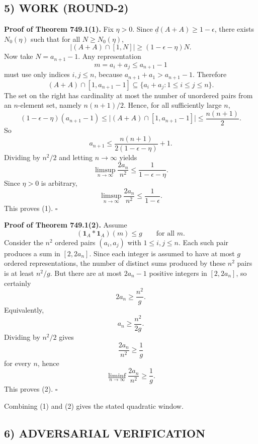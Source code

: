 \subsection*{5) WORK (ROUND-2)}

\noindent
\textbf{Proof of Theorem 749.1(1).}
Fix $\eta>0$.
Since $\underline d(A+A)\ge 1-\epsilon$, there exists $N_0(\eta)$ such that for all $N\ge N_0(\eta)$,
\[
|(A+A)\cap[1,N]|\ge (1-\epsilon-\eta)N.
\]
Now take $N=a_{n+1}-1$.
Any representation
\[
m=a_i+a_j\le a_{n+1}-1
\]
must use only indices $i,j\le n$, because $a_{n+1}+a_1>a_{n+1}-1$.
Therefore
\[
(A+A)\cap[1,a_{n+1}-1]
\subseteq
\{a_i+a_j:1\le i\le j\le n\}.
\]
The set on the right has cardinality at most the number of unordered pairs from an $n$-element set, namely $n(n+1)/2$.
Hence, for all sufficiently large $n$,
\[
(1-\epsilon-\eta)(a_{n+1}-1)
\le
\bigl|(A+A)\cap[1,a_{n+1}-1]\bigr|
\le
\frac{n(n+1)}{2}.
\]
So
\[
a_{n+1}\le \frac{n(n+1)}{2(1-\epsilon-\eta)}+1.
\]
Dividing by $n^2/2$ and letting $n\to\infty$ yields
\[
\limsup_{n\to\infty}\frac{2a_n}{n^2}\le \frac{1}{1-\epsilon-\eta}.
\]
Since $\eta>0$ is arbitrary,
\[
\limsup_{n\to\infty}\frac{2a_n}{n^2}\le \frac{1}{1-\epsilon}.
\]
This proves (1). \hfill $\square$

\medskip
\noindent
\textbf{Proof of Theorem 749.1(2).}
Assume
\[
(\mathbf 1_A\ast \mathbf 1_A)(m)\le g
\qquad\text{for all }m.
\]
Consider the $n^2$ ordered pairs $(a_i,a_j)$ with $1\le i,j\le n$.
Each such pair produces a sum in $[2,2a_n]$.
Since each integer is assumed to have at most $g$ ordered representations, the number of distinct sums produced by these $n^2$ pairs is at least $n^2/g$.
But there are at most $2a_n-1$ positive integers in $[2,2a_n]$, so certainly
\[
2a_n\ge \frac{n^2}{g}.
\]
Equivalently,
\[
a_n\ge \frac{n^2}{2g}.
\]
Dividing by $n^2/2$ gives
\[
\frac{2a_n}{n^2}\ge \frac1g
\]
for every $n$, hence
\[
\liminf_{n\to\infty}\frac{2a_n}{n^2}\ge \frac1g.
\]
This proves (2). \hfill $\square$

\medskip
Combining (1) and (2) gives the stated quadratic window.

\subsection*{6) ADVERSARIAL VERIFICATION}

